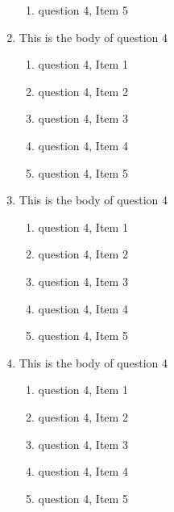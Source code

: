 \documentclass{article}
\begin{document}
\begin{enumerate}
\begin{enumerate}
    \item
    question 4, Item 5

  \end{enumerate}

\item
This is the body of question 4

  \begin{enumerate}

    \item
    question 4, Item 1

    \item
    question 4, Item 2

    \item
    question 4, Item 3

    \item
    question 4, Item 4

    \item
    question 4, Item 5

  \end{enumerate}

\item
This is the body of question 4

  \begin{enumerate}

    \item
    question 4, Item 1

    \item
    question 4, Item 2

    \item
    question 4, Item 3

    \item
    question 4, Item 4

    \item
    question 4, Item 5

  \end{enumerate}

\item
This is the body of question 4

  \begin{enumerate}

    \item
    question 4, Item 1

    \item
    question 4, Item 2

    \item
    question 4, Item 3

    \item
    question 4, Item 4

    \item
    question 4, Item 5

  \end{enumerate}


\end{enumerate} %
\end{document}
